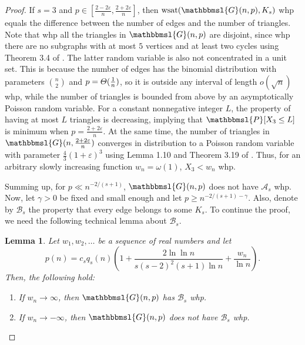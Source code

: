 \documentclass[hidelinks, 11pt]{article}
\theoremstyle{plain}
\newtheorem{lemma}[theorem]{Lemma}
\theoremstyle{definition}
\begin{document}
\begin{proof}
If $s=3$ and $p\in[\tfrac{2-2\varepsilon}{n}, \tfrac{2+2\varepsilon}{n}]$,  then $\mathrm{wsat}(\mathbbmsl{G}(n, p), K_s)$ whp       equals the difference between the number of edges and the number of triangles. Note that whp all the triangles in $\mathbbmsl{G}(n, p)$ are disjoint,  since whp there are no subgraphs with at most $5$ vertices and at least two cycles  using   Theorem 3.4 of   \cite{RG}. The latter random variable is also not concentrated in a unit set. This is because the number of edges has the binomial distribution with parameters ${n\choose 2}$ and $p=\mathnormal{\Theta}(\tfrac{1}{n})$,  so
it is outside any interval of length  $o(\sqrt{n})$ whp,  while the number of triangles is bounded from above by an asymptotically Poisson random variable.  For a constant nonnegative  integer  $L$, the property of having at most $L$ triangles is   decreasing,  implying that $\mathbbmsl{P}[X_3\leq L]$ is minimum when $p=\tfrac{2+2\varepsilon}{n}$. At the same time,  the number of  triangles in $\mathbbmsl{G}(n, \tfrac{2+2\varepsilon}{n})$ converges in distribution to
a Poisson random variable with parameter $\tfrac{4}{3}(1+\varepsilon)^3$
using    Lemma 1.10 and Theorem 3.19 of \cite{RG}. Thus,   for an arbitrary slowly increasing function $w_n=\omega(1)$,   $X_3<w_n$ whp.


Summing up, for $p\ll n^{-2/(s+1)}$,   $\mathbbmsl{G}(n,p)$ does not have $\mathcal{A}_s$ whp.
Now, let $\gamma>0$ be fixed and small enough  and  let $p\geq n^{-2/(s+1)-\gamma}$. Also, denote  by $\mathcal{B}_s$ the property  that every edge belongs to some $K_s$. To continue  the proof, we need the following technical lemma about $\mathcal{B}_s$.



\begin{lemma}\label{edge_in_clique}
Let $w_1, w_2, \ldots$ be a sequence of real numbers  and let
$$p(n)=c_sq_s(n)\left(1+\frac{2\ln\ln n}{s(s-2)^2(s+1)\ln n}+\frac{w_n}{\ln n}\right).$$
Then, the  following hold:
\begin{enumerate}
\item[{\rm (i)}] If $w_n\to\infty$, then   $\mathbbmsl{G}(n,p)$ has $\mathcal{B}_s$ whp.
\item[{\rm (ii)}] If $w_n\to-\infty$, then   $\mathbbmsl{G}(n,p)$ does not have $\mathcal{B}_s$ whp.
\end{enumerate}
\end{lemma}




\end{proof}
\end{document}
